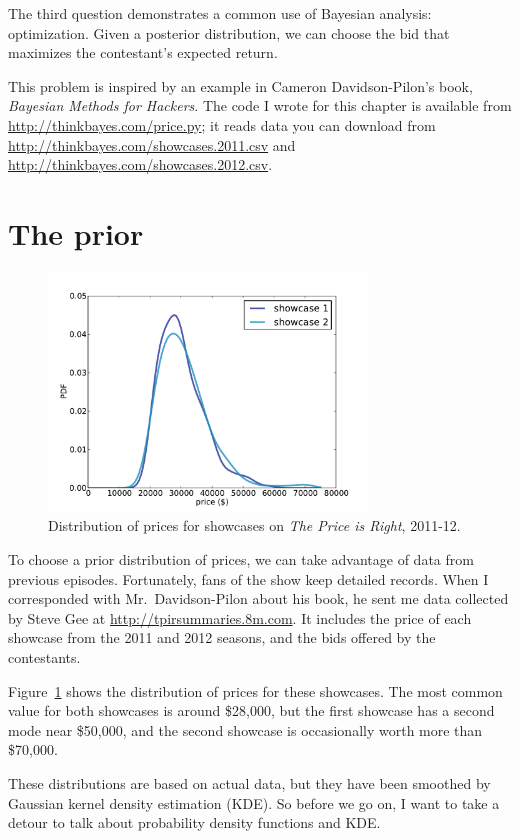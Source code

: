 \documentclass[12pt]{book}
\begin{document}
The third question demonstrates a common use of Bayesian analysis:
optimization.  Given a posterior distribution, we can choose
the bid that maximizes the contestant's expected return.

This problem is inspired by an example in Cameron Davidson-Pilon's
book, {\it Bayesian Methods for Hackers}.  The code I wrote for this
chapter is available from \url{http://thinkbayes.com/price.py}; it
reads data you can download from
\url{http://thinkbayes.com/showcases.2011.csv} and
\url{http://thinkbayes.com/showcases.2012.csv}.


\section{The prior}

\begin{figure}
\centerline{\includegraphics[height=2.5in]{figs/price1.pdf}}
\caption{Distribution of prices for showcases on
{\it The Price is Right}, 2011-12.}
\label{fig.price1}
\end{figure}

To choose a prior distribution of prices, we can take advantage
of data from previous episodes.  Fortunately, fans of the show
keep detailed records.  When I corresponded with Mr.~Davidson-Pilon
about his book, he sent me data collected by Steve Gee at
\url{http://tpirsummaries.8m.com}.  It includes the price of
each showcase from the 2011 and 2012 seasons, and the bids
offered by the contestants.

Figure~\ref{fig.price1} shows the distribution of prices for these
showcases.  The most common value for both showcases is around
\$28,000, but the first showcase has a second mode near \$50,000,
and the second showcase is occasionally worth more than \$70,000.

These distributions are based on actual data, but they
have been smoothed by Gaussian kernel density estimation (KDE).
So before we go on, I want to take a detour to talk about 
probability density functions and KDE.
\end{document}
